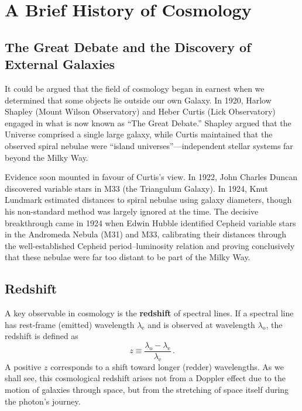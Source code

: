 \section{A Brief History of Cosmology}
\label{sec:history}

\subsection*{The Great Debate and the Discovery of External Galaxies}

It could be argued that the field of cosmology began in earnest when we determined that some objects lie outside our own Galaxy. In 1920, Harlow Shapley (Mount Wilson Observatory) and Heber Curtis (Lick Observatory) engaged in what is now known as ``The Great Debate.'' Shapley argued that the Universe comprised a single large galaxy, while Curtis maintained that the observed spiral nebulae were ``island universes''---independent stellar systems far beyond the Milky Way.

Evidence soon mounted in favour of Curtis's view. In 1922, John Charles Duncan discovered variable stars in M33 (the Triangulum Galaxy). In 1924, Knut Lundmark estimated distances to spiral nebulae using galaxy diameters, though his non-standard method was largely ignored at the time. The decisive breakthrough came in 1924 when Edwin Hubble identified Cepheid variable stars in the Andromeda Nebula (M31) and M33, calibrating their distances through the well-established Cepheid period--luminosity relation and proving conclusively that these nebulae were far too distant to be part of the Milky Way.

\subsection*{Redshift}

A key observable in cosmology is the \textbf{redshift} of spectral lines. If a spectral line has rest-frame (emitted) wavelength $\lambda_{\mathrm{e}}$ and is observed at wavelength $\lambda_{\mathrm{o}}$, the redshift is defined as
\begin{equation}
\boxed{z \equiv \frac{\lambda_{\mathrm{o}} - \lambda_{\mathrm{e}}}{\lambda_{\mathrm{e}}}\,.}
\label{eq:redshift_intro}
\end{equation}
A positive $z$ corresponds to a shift toward longer (redder) wavelengths. As we shall see, this cosmological redshift arises not from a Doppler effect due to the motion of galaxies through space, but from the stretching of space itself during the photon's journey.

